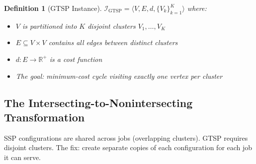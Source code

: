 \documentclass[12pt]{article}
\newtheorem{definition}{Definition}[section]
\begin{document}
	\begin{definition}[GTSP Instance]
		$\mathcal{I}_{\text{GTSP}} = \langle V, E, d, \{V_k\}_{k=1}^{K} \rangle$ where:
		\begin{itemize}
			\item $V$ is partitioned into $K$ disjoint clusters $V_1, \ldots, V_K$
			\item $E \subseteq V \times V$ contains all edges between distinct clusters
			\item $d: E \to \mathbb{R}^+$ is a cost function
			\item The goal: minimum-cost cycle visiting exactly one vertex per cluster
		\end{itemize}
	\end{definition}
	
	\subsection{The Intersecting-to-Nonintersecting Transformation}
	
	\begin{intuitionbox}
		SSP configurations are shared across jobs (overlapping clusters). GTSP requires disjoint clusters. The fix: create separate copies of each configuration for each job it can serve.
	\end{intuitionbox}
	
\end{document}
